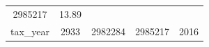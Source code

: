 \documentclass[]{book}
\theoremstyle{definition}
\theoremstyle{definition}
\theoremstyle{definition}
\theoremstyle{remark}
\begin{document}
\begin{longtable}[]{@{}ccccc@{}}
\begin{minipage}[t]{0.12\columnwidth}
2985217\strut
\end{minipage} & \begin{minipage}[t]{0.12\columnwidth}\centering\strut
13.89\strut
\end{minipage}\tabularnewline
\begin{minipage}[t]{0.35\columnwidth}\centering\strut
tax\_year\strut
\end{minipage} & \begin{minipage}[t]{0.12\columnwidth}\centering\strut
2933\strut
\end{minipage} & \begin{minipage}[t]{0.13\columnwidth}\centering\strut
2982284\strut
\end{minipage} & \begin{minipage}[t]{0.12\columnwidth}\centering\strut
2985217\strut
\end{minipage} & \begin{minipage}[t]{0.12\columnwidth}\centering\strut
2016\strut
\end{minipage}\tabularnewline
\bottomrule
\end{longtable}
\end{document}

